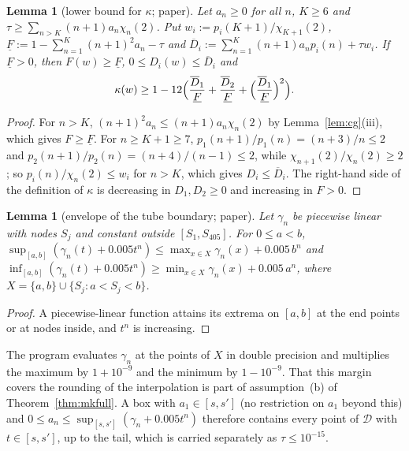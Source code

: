 \documentclass[11pt,a4paper]{article}
\newtheorem{lemma}[theorem]{Lemma}
\theoremstyle{definition}
\theoremstyle{remark}
\newcommand{\cD}{\mathcal{D}}
\begin{document}
\begin{lemma}[lower bound for $\kappa$; paper]\label{lem:kappa}
Let $a_n\ge0$ for all $n$, $K\ge6$ and $\tau\ge\sum_{n>K}(n+1)a_n\chi_n(2)$.
Put $w_i:=p_i(K+1)/\chi_{K+1}(2)$, $\underline F:=1-\sum_{n=1}^K(n+1)^2a_n-\tau$ and $\overline D_i:=\sum_{n=1}^{K}(n+1)a_np_i(n)+\tau w_i$.
If $\underline F>0$, then $F(w)\ge\underline F$, $0\le D_i(w)\le\overline D_i$ and
\[
\kappa(w)\ge1-12\Bigl(\frac{\overline D_1}{\underline F}+\frac{\overline D_2}{\underline F}+\Bigl(\frac{\overline D_1}{\underline F}\Bigr)^2\Bigr).
\]
\end{lemma}
\begin{proof}
For $n>K$, $(n+1)^2a_n\le(n+1)a_n\chi_n(2)$ by Lemma~\ref{lem:cg}(iii), which gives $F\ge\underline F$.
For $n\ge K+1\ge7$, $p_1(n+1)/p_1(n)=(n+3)/n\le2$ and $p_2(n+1)/p_2(n)=(n+4)/(n-1)\le2$, while $\chi_{n+1}(2)/\chi_n(2)\ge2$; so $p_i(n)/\chi_n(2)\le w_i$ for $n>K$, which gives $D_i\le\overline D_i$.
The right-hand side of the definition of $\kappa$ is decreasing in $D_1,D_2\ge0$ and increasing in $F>0$.
\end{proof}

\begin{lemma}[envelope of the tube boundary; paper]\label{lem:env}
Let $\gamma_n$ be piecewise linear with nodes $S_j$ and constant outside $[S_1,S_{405}]$.
For $0\le a<b$, $\sup_{[a,b]}(\gamma_n(t)+0.005t^n)\le\max_{x\in X}\gamma_n(x)+0.005\,b^n$ and $\inf_{[a,b]}(\gamma_n(t)+0.005t^n)\ge\min_{x\in X}\gamma_n(x)+0.005\,a^n$, where $X=\{a,b\}\cup\{S_j:a<S_j<b\}$.
\end{lemma}
\begin{proof}
A piecewise-linear function attains its extrema on $[a,b]$ at the end points or at nodes inside, and $t^n$ is increasing.
\end{proof}
The program evaluates $\gamma_n$ at the points of $X$ in double precision and multiplies the maximum by $1+10^{-9}$ and the minimum by $1-10^{-9}$.
That this margin covers the rounding of the interpolation is part of assumption~(b) of Theorem~\ref{thm:mkfull}.
A box with $a_1\in[s,s']$ (no restriction on $a_1$ beyond this) and $0\le a_n\le\sup_{[s,s']}(\gamma_n+0.005t^n)$ therefore contains every point of $\cD$ with $t\in[s,s']$, up to the tail, which is carried separately as $\tau\le10^{-15}$.
\end{document}
